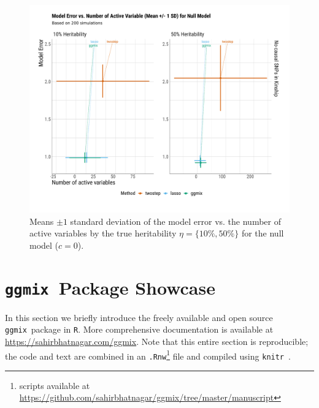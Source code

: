 \documentclass[12pt,letter]{article}\usepackage[]{graphicx}\usepackage[]{color}
\newenvironment{knitrout}{}{} %
\newcommand{\ggmix}{\texttt{ggmix}}
\begin{document}
\begin{knitrout}\scriptsize
{}\color{fgcolor}\begin{figure}[H]

{\centering \includegraphics[width=1\linewidth]{figure/plot-me-nactive-sim-null-1} 

}

\caption[Means $\pm 1$ standard deviation of the model error vs]{Means $\pm 1$ standard deviation of the model error vs. the number of active variables by the true heritability $\eta = \lbrace 10\%, 50\% \rbrace$ for the null model ($c=0$).}\label{fig:plot-me-nactive-sim-null}
\end{figure}


\end{knitrout}

\FloatBarrier

\newpage


\section{\ggmix ~Package Showcase} \label{ap:showcase}

In this section we briefly introduce the freely available and open source \ggmix ~package in \texttt{R}. More comprehensive documentation is available at \url{https://sahirbhatnagar.com/ggmix}. Note that this entire section is reproducible; the code and text are combined in an \texttt{.Rnw}\footnote[1]{scripts available at \url{https://github.com/sahirbhatnagar/ggmix/tree/master/manuscript}} file and compiled using \texttt{knitr}~\citep{xie2015dynamic}.
\end{document}
